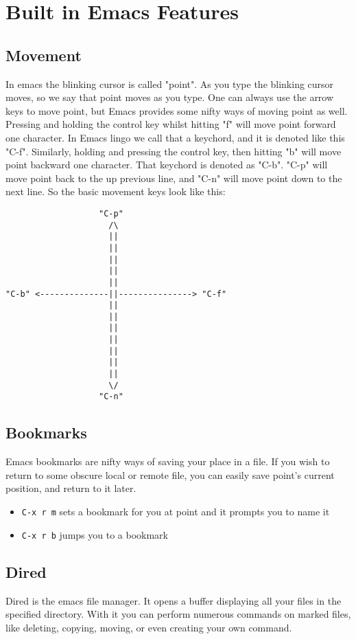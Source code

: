 \documentclass[11pt]{article}
\begin{document}
\section{Built in Emacs Features}
\label{sec:orgheadline17}
\subsection{Movement}
\label{sec:orgheadline2}
In emacs the blinking cursor is called "point".  As you type the blinking cursor moves, so we say that point moves as you type.  One can always use the arrow keys to move point, but Emacs provides some nifty ways of moving point as well.  Pressing and holding the control key whilst hitting "f" will move point forward one character.  In Emacs lingo we call that a keychord, and it is denoted like this "C-f".  Similarly, holding and pressing the control key, then hitting "b" will move point backward one character.  That keychord is denoted as "C-b".  "C-p" will move point back to the up previous line, and "C-n" will move point down to the next line.  So the basic movement keys look like this:

\begin{verbatim}
                   "C-p"
                     /\
                     ||
                     ||
                     ||
                     ||
                     ||
"C-b" <--------------||---------------> "C-f"
                     ||
                     ||
                     ||
                     ||
                     ||
                     ||
                     ||
                     \/
                   "C-n"
\end{verbatim}

\subsection{Bookmarks}
\label{sec:orgheadline3}
Emacs bookmarks are nifty ways of saving your place in a file.  If you wish to return to some obscure local or remote file, you can easily save point's current position, and return to it later.

\begin{itemize}
\item \texttt{C-x r m}  sets a bookmark for you at point and it prompts you to name it
\item \texttt{C-x r b}  jumps you to a bookmark
\end{itemize}
\subsection{Dired}
\label{sec:orgheadline6}
Dired is the emacs file manager.  It opens a buffer displaying all your files in the specified directory.  With it you can perform numerous commands on marked files, like deleting, copying, moving, or even creating your own command.
\end{document}
